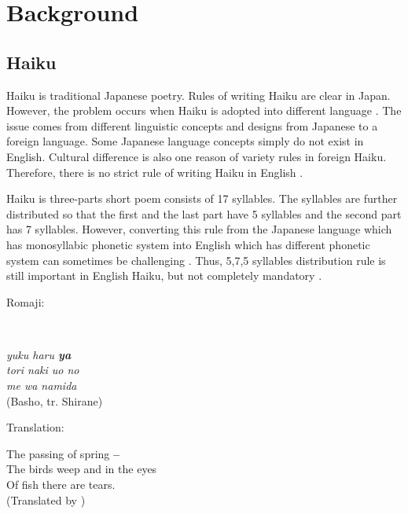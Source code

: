 

\section{Background}


\subsection{Haiku}


Haiku is traditional Japanese poetry. Rules of writing Haiku are clear in Japan. However, the problem occurs when Haiku is adopted into different language \cite{Haiku_poem}. The issue comes from different linguistic concepts and designs from Japanese to a foreign language. Some Japanese language concepts simply do not exist in English. Cultural difference is also one reason of variety rules in foreign Haiku. Therefore, there is no strict rule of writing Haiku in English \cite{Haiku_JP}.


Haiku is three-parts short poem consists of 17 syllables. The syllables are further distributed so that the first and the last part have 5 syllables and the second part has 7 syllables. However, converting this rule from the Japanese language which has monosyllabic phonetic system into English which has different phonetic system can sometimes be challenging  \cite{Haiku_poem}. Thus, 5,7,5 syllables distribution rule is still important in English Haiku, but not completely mandatory \cite{Haiku_JP}.



Romaji:

~\\
{\centering\textit{
yuku haru \textbf{ya} \\
tori naki uo no \\
me wa namida}  \\
(Basho, tr. Shirane)
\par
}


Translation:\\

{\centering

The passing of spring \textbf{--}\\
The birds weep and in the eyes\\
Of fish there are tears.\\
(Translated by \citeauthor{keene1999travelers}) \cite{keene1999travelers}
\par

}


~\\


